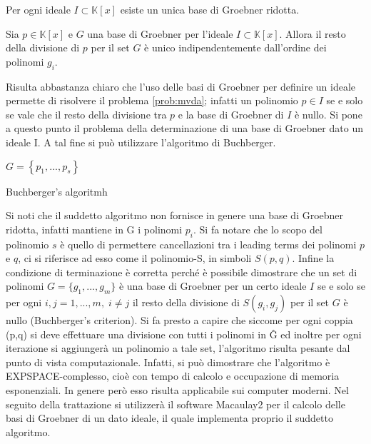 \begin{prop}
	Per ogni ideale $I \subset \mathbb{K}[x]$ esiste un unica base di Groebner ridotta.
\end{prop}

\begin{prop}
	Sia $p \in \mathbb{K}[x]$ e $G$ una base di Groebner per l'ideale $I \subset \mathbb{K}[x]$. Allora il resto della divisione di $p$ per il set $G$ è unico indipendentemente dall'ordine dei polinomi $g_i$.
\end{prop}
Risulta abbastanza chiaro che l'uso delle basi di Groebner per definire un ideale permette di risolvere il problema \ref{prob:mvda}; infatti un polinomio $p \in I$ se e solo se vale che il resto della divisione tra $p$ e la base di Groebner di $I$ è nullo.
Si pone a questo punto il problema della determinazione di una base di Groebner dato un ideale I. A tal fine si può utilizzare l'algoritmo di Buchberger.

\begin{algorithm}[H]
	\SetAlgoLined
	$G = \left\lbrace p_1, ..., p_s \right\rbrace $\;
	
	\caption{Buchberger's algoritmh}
\end{algorithm}

\medskip
Si noti che il suddetto algoritmo non fornisce in genere una base di Groebner ridotta, infatti mantiene in G i polinomi $p_i$. 
Si fa notare che lo scopo del polinomio $s$ è quello di permettere cancellazioni tra i leading terms dei polinomi $p$ e $q$, ci si riferisce ad esso come il polinomio-S, in simboli $S(p,q)$. Infine la condizione di terminazione è corretta perché è possibile dimostrare che un set di polinomi $G = \{g_1, ..., g_m\}$ è una base di Groebner per un certo ideale $I$ se e solo se per ogni $i,j = 1,..., m , \; i\neq j$ il resto della divisione di $S(g_i, g_j)$ per il set $G$ è nullo (Buchberger's criterion). Si fa presto a capire che siccome per ogni coppia (p,q) si deve effettuare una divisione con tutti i polinomi in \^{G} ed inoltre per ogni iterazione si aggiungerà un polinomio a tale set, l'algoritmo risulta pesante dal punto di vista computazionale. Infatti, si può dimostrare che l'algoritmo è EXPSPACE-complesso, cioè con tempo di calcolo e occupazione di memoria esponenziali. In genere però esso risulta applicabile sui computer moderni.
Nel seguito della trattazione si utilizzerà il software Macaulay2 per il calcolo delle basi di Groebner di un dato ideale, il quale implementa proprio il suddetto algoritmo.



